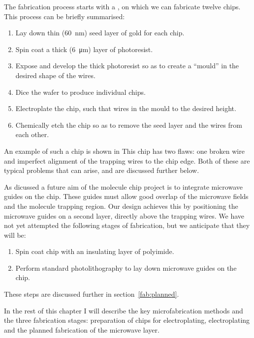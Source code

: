 The fabrication process starts with a ,
on which we can fabricate twelve  chips. This process can be
briefly summarised:
\begin{enumerate}
\item Lay down thin (\SI{60}{\nano\meter}) seed layer of gold for each chip.
\item Spin coat a thick (\SI{6}{\micro\meter}) layer of photoresist.
\item Expose and develop the thick photoresist so as to create a ``mould''
in the desired shape of the wires.
\item Dice the wafer to produce individual chips.
\item Electroplate the chip, such that wires  in the mould to the
desired height.
\item Chemically etch the chip so as to remove the seed layer and
   the wires from each other.
\end{enumerate}

An example of such a chip is shown in  This chip has two flaws: one broken wire
 and imperfect alignment of the trapping wires
to the chip edge. Both of these are typical problems that can arise, and are
discussed further below.

As dicussed  a future aim of the molecule chip project is to
integrate microwave guides on the chip. These guides must allow good overlap of
the microwave fields and the molecule trapping region. Our design achieves this
by positioning the microwave guides on a second layer, directly above the
trapping wires.  We have not yet attempted the following stages of
fabrication, but we anticipate that they will be:
\begin{enumerate}[resume]
    \item Spin coat chip with an insulating layer of polyimide.
    \item Perform standard photolithography to lay down microwave guides on the
      chip.
\end{enumerate}
These steps are discussed further in section~\ref{fab:planned}.

In the rest of this chapter I will describe the key microfabrication methods
and the three fabrication stages: preparation of chips for electroplating,
electroplating and the planned fabrication of the microwave layer.

